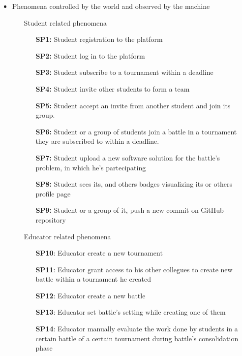 \documentclass{article}
\newcounter{subsubsubsection}[subsubsection]
\begin{document}
\begin{itemize}
    \item Phenomena controlled by the world and observed by the machine
          \begin{enumerate}
              \item[\ding{228}] Student related phenomena
                    \begin{enumerate}
                        \item[\textbf{SP1:}] Student registration to the platform
                        \item[\textbf{SP2:}] Student log in to the platform
                        \item[\textbf{SP3:}] Student subscribe to a tournament within a deadline
                        \item[\textbf{SP4:}] Student invite other students to form a team
                        \item[\textbf{SP5:}] Student accept an invite from another student and join its group.
                        \item[\textbf{SP6:}] Student or a group of students join a battle in a tournament they are subscribed to within a deadline.
                        \item[\textbf{SP7:}] Student upload a new software solution for the battle's problem, in which he's partecipating
                        \item[\textbf{SP8:}] Student sees its, and others badges visualizing its or others profile page
                        \item[\textbf{SP9:}] Student or a group of it, push a new commit on GitHub repository
                    \end{enumerate}
              \item[\ding{228}] Educator related phenomena
                    \begin{enumerate}
                        \item[\textbf{SP10}:] Educator create a new tournament
                        \item[\textbf{SP11}:] Educator grant access to his other collegues to create new battle within a tournament he created
                        \item[\textbf{SP12}:] Educator create a new battle
                        \item[\textbf{SP13}:] Educator set battle's setting while creating one of them
                        \item[\textbf{SP14}:] Educator manually evaluate the work done by students in a certain battle of a certain tournament during battle's consolidation phase

\end{enumerate}
\end{enumerate}
\end{itemize}
\end{document}
